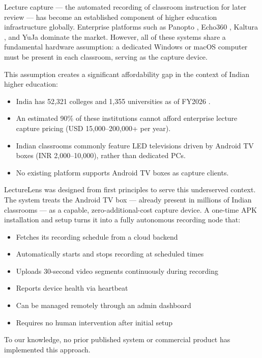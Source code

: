 \documentclass[12pt,a4paper]{article}
\begin{document}
Lecture capture — the automated recording of classroom instruction for later review — has become an established component of higher education infrastructure globally. Enterprise platforms such as Panopto \cite{panopto2024}, Echo360 \cite{echo360}, Kaltura \cite{kaltura}, and YuJa \cite{yuja} dominate the market. However, all of these systems share a fundamental hardware assumption: a dedicated Windows or macOS computer must be present in each classroom, serving as the capture device.

This assumption creates a significant affordability gap in the context of Indian higher education:

\begin{itemize}
    \item India has 52{,}321 colleges and 1{,}355 universities as of FY2026 \cite{ibef2024}.
    \item An estimated 90\% of these institutions cannot afford enterprise lecture capture pricing (USD 15{,}000--200{,}000+ per year).
    \item Indian classrooms commonly feature LED televisions driven by Android TV boxes (INR 2{,}000--10{,}000), rather than dedicated PCs.
    \item No existing platform supports Android TV boxes as capture clients.
\end{itemize}

LectureLens was designed from first principles to serve this underserved context. The system treats the Android TV box --- already present in millions of Indian classrooms --- as a capable, zero-additional-cost capture device. A one-time APK installation and setup turns it into a fully autonomous recording node that:

\begin{itemize}
    \item Fetches its recording schedule from a cloud backend
    \item Automatically starts and stops recording at scheduled times
    \item Uploads 30-second video segments continuously during recording
    \item Reports device health via heartbeat
    \item Can be managed remotely through an admin dashboard
    \item Requires no human intervention after initial setup
\end{itemize}

To our knowledge, no prior published system or commercial product has implemented this approach.
\end{document}
